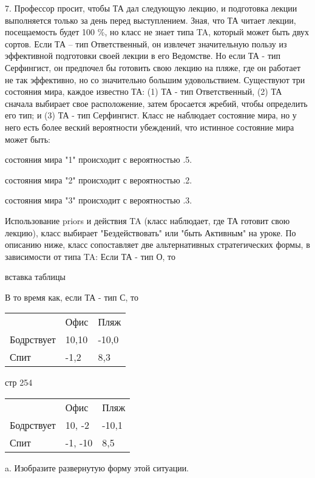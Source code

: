 \documentclass[a4paper,12pt]{article}
\begin{document}
7. Профессор просит, чтобы ТА дал следующую лекцию,
и подготовка лекции выполняется только за день
перед выступлением. Зная, что ТА читает лекции,
посещаемость будет 100 \%, но класс не знает типа
TA, который может быть двух сортов. Если ТА -- тип
Ответственный, он извлечет значительную пользу из
эффективной подготовки своей лекции в его
Ведомстве. Но если ТА - тип Серфингист, он
предпочел бы готовить свою лекцию на пляже, где он
работает не так эффективно, но со значительно
большим удовольствием. Существуют три состояния
мира, каждое известно ТА: (1) ТА - тип
Ответственный, (2) ТА сначала выбирает свое
расположение, затем бросается жребий, чтобы
определить его тип; и (3) ТА - тип Серфингист.
Класс не наблюдает состояние мира, но у него есть
более веский вероятности убеждений, что истинное
состояние мира может быть:

состояния мира "1" происходит с вероятностью .5.

состояния мира "2" происходит с вероятностью .2.

состояния мира "3" происходит с вероятностью .3.

Использование priors и действия TA (класс
наблюдает, где ТА готовит свою лекцию), класс
выбирает "Бездействовать" или "быть Активным" на
уроке. По описанию ниже, класс сопоставляет две
альтернативных стратегических формы, в зависимости
от типа TA: Если ТА - тип О, то

вставка таблицы

В то время как, если ТА - тип С, то

\begin{tabular}{lll}
& Офис & Пляж \\ \cline{2-3} Бодрствует &
\multicolumn{1}{|l}{10,10} &
\multicolumn{1}{|l|}{-10,0} \\ \cline{2-3} Спит &
\multicolumn{1}{|l}{-1,2} &
\multicolumn{1}{|l|}{8,3} \\ \cline{2-3}
\end{tabular}

стр 254

\begin{tabular}{lll}
& Офис & Пляж \\ \cline{2-3} Бодрствует &
\multicolumn{1}{|l}{10, -2} &
\multicolumn{1}{|l|}{-10,1} \\ \cline{2-3} Спит &
\multicolumn{1}{|l}{-1, -10} &
\multicolumn{1}{|l|}{8,5} \\ \cline{2-3}
\end{tabular}

a. Изобразите развернутую форму этой ситуации.
\end{document}
